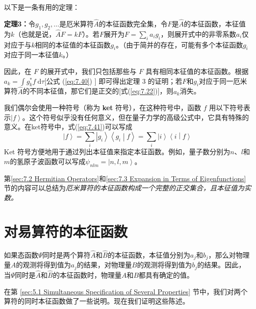     以下是一条有用的定理：
    \begin{center}
        \parbox{0.8\textwidth}{
            \textbf{定理3：}令$g_1,g_2,\ldots$是厄米算符$\hat{A}$的本征函数完全集，令$F$是$\hat{A}$的本征函数，本征值为$k$（也就是说，$\hat{A}F = kF$）。若$F$展开为$F = \sum_{i}a_ig_i$，则展开式中的非零系数$a_i$仅对应于与$k$相同的本征值的本征函数$g_i$。（由于简并的存在，可能有多个本征函数$g_i$对应于同一本征值$k$。）
            
        }
    \end{center}

    因此，在 $F$ 的展开式中，我们只包括那些与 $F$ 具有相同本征值的本征函数。根据 $a_k = \int g_k^{\ast} f \:\mathrm{d}\tau$[公式 (\ref{eq:7.40}) ] 即可得出定理 3 的证明；若$F$和$g_i$对应于同一厄米算符$\hat{A}$的不同本征值，那它们是正交的[式(\ref{eq:7.22})]，则$a_k$消失。

    我们偶尔会使用一种符号（称为 \textbf{ket} 符号），在这种符号中，函数 $f$ 用以下符号表示$\left| f \right\rangle$。这个符号似乎没有任何意义，但在量子力学的高级公式中，它具有特殊的意义。在ket符号中，式(\ref{eq:7.41})可以写成
    \begin{equation}
        \left| f \right\rangle = \sum_{i} \left| g_i\right\rangle \left\langle g_i \middle| f \right\rangle = \sum_i \left| i \right\rangle \left\langle i \middle| f \right\rangle
        \label{eq:7.42}
    \end{equation}
    Ket 符号方便地用于通过列出本征值来指定本征函数。例如，量子数分别为$n$、$l$和$m$的氢原子波函数可以写成$\psi_{nlm} = \left| n,l,m \right\rangle$。

    第\ref{sec:7.2 Hermitian Operators}和\ref{sec:7.3 Expansion in Terms of Eigenfunctions}节的内容可以总结为\textit{厄米算符的本征函数构成一个完整的正交集合，且本征值为实数。}

\section{对易算符的本征函数}
\label{sec:7.4 Eigenfunctions of Commuting Operators}
    如果态函数$\Psi$同时是两个算符$\hat{A}$和$\hat{B}$的本征函数，本征值分别为$a_j$和$b_j$，那么对物理量$A$的观测将得到值为$a_j$的结果，对物理量$B$的观测将得到值为$b_j$的结果。因此，当$\Psi$同时是$\hat{A}$和$\hat{B}$的本征函数时，物理量$A$和$B$都具有确定的值。

    在第 \ref{sec:5.1 Simultaneous Specification of Several Properties} 节中，我们对两个算符的同时本征函数做了一些说明。现在我们证明这些陈述。

